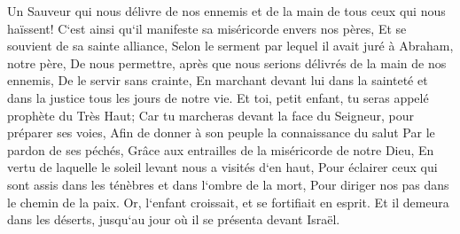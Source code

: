 \verse Un Sauveur qui nous délivre de nos ennemis et de la main de tous ceux qui nous haïssent! 
\verse C`est ainsi qu`il manifeste sa miséricorde envers nos pères, Et se souvient de sa sainte alliance, 
\verse Selon le serment par lequel il avait juré à Abraham, notre père, 
\verse De nous permettre, après que nous serions délivrés de la main de nos ennemis, De le servir sans crainte, 
\verse En marchant devant lui dans la sainteté et dans la justice tous les jours de notre vie. 
\verse Et toi, petit enfant, tu seras appelé prophète du Très Haut; Car tu marcheras devant la face du Seigneur, pour préparer ses voies, 
\verse Afin de donner à son peuple la connaissance du salut Par le pardon de ses péchés, 
\verse Grâce aux entrailles de la miséricorde de notre Dieu, En vertu de laquelle le soleil levant nous a visités d`en haut, 
\verse Pour éclairer ceux qui sont assis dans les ténèbres et dans l`ombre de la mort, Pour diriger nos pas dans le chemin de la paix. 
\verse Or, l`enfant croissait, et se fortifiait en esprit. Et il demeura dans les déserts, jusqu`au jour où il se présenta devant Israël. 

\chapter{}

